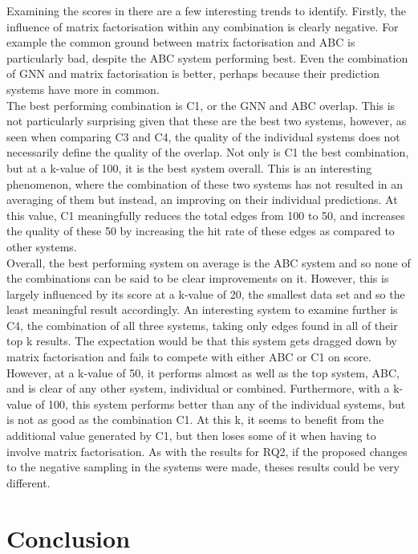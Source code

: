 \documentclass{l4proj}
\begin{document}
Examining the scores in  there are a few interesting trends to identify. Firstly, the influence of matrix factorisation within any combination is clearly negative. For example the common ground between matrix factorisation and ABC is particularly bad, despite the ABC system performing best. Even the combination of GNN and matrix factorisation is better, perhaps because their prediction systems have more in common. \\

The best performing combination is C1, or the GNN and ABC overlap. This is not particularly surprising given that these are the best two systems, however, as seen when comparing C3 and C4, the quality of the individual systems does not necessarily define the quality of the overlap. Not only is C1 the best combination, but at a k-value of 100, it is the best system overall. This is an interesting phenomenon, where the combination of these two systems has not resulted in an averaging of them but instead, an improving on their individual predictions. At this value, C1 meaningfully reduces the total edges from 100 to 50, and increases the quality of these 50 by increasing the hit rate of these edges as compared to other systems. \\

Overall, the best performing system on average is the ABC system and so none of the combinations can be said to be clear improvements on it. However, this is largely influenced by its score at a k-value of 20, the smallest data set and so the least meaningful result accordingly. An interesting system to examine further is C4, the combination of all three systems, taking only edges found in all of their top k results. The expectation would be that this system gets dragged down by matrix factorisation and fails to compete with either ABC or C1 on score. However, at a k-value of 50, it performs almost as well as the top system, ABC, and is clear of any other system, individual or combined. Furthermore, with a k-value of 100, this system performs better than any of the individual systems, but is not as good as the combination C1. At this k, it seems to benefit from the additional value generated by C1, but then loses some of it when having to involve matrix factorisation. As with the results for RQ2, if the proposed changes to the negative sampling in the systems were made, theses results could be very different. \\

\chapter{Conclusion}    
\end{document}
